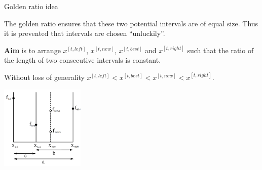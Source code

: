 \begin{vbframe}{Golden ratio idea}

The golden ratio ensures that these two potential intervals are of equal size. Thus it is prevented that intervals are chosen \enquote{unluckily}.

\lz

\textbf{Aim} is to arrange $x^{[t, left]}$, $x^{[t, new]}$, $x^{[t, best]}$ and $x^{[t, right]}$ such that the ratio of the length of two consecutive intervals is constant.

\framebreak

Without loss of generality $x^{[t, left]}< x^{[t, best]}<x^{[t, new]}<x^{[t, right]}$. \\

\vspace*{-0.3cm}

\begin{center}
\includegraphics[width = 0.3\textwidth]{figure_man/goldensec.png}
\end{center}

\vspace*{-0.5cm}

\begin{itemize}








\end{itemize}
\end{vbframe}

